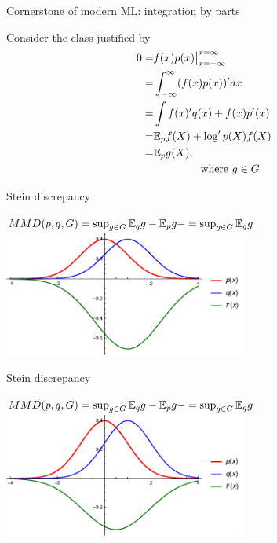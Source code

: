 \documentclass{beamer}
\begin{document}
  \begin{frame}{Cornerstone of modern ML: integration by parts}
  \begin{center}
  Consider the  class   justified by 
\begin{align*}
 0= &  f(x) p(x)  \big|_{x=-\infty}^{x=\infty} \\
   = &  \int_{-\infty}^{\infty} (f(x) p(x) )'  dx \\
   = &  \int   f(x)' q(x)   + f(x)p'(x)  \\
   = &  \mathbb{E}_p f(X)  +  \log' p(X) f(X) \\
   = & \mathbb{E}_p g(X), \\
    & \quad \quad \quad  \quad  \text{ where } g \in G
\end{align*}
\end{center}

 \end{frame} 
  

 \begin{frame}{Stein discrepancy }
 \begin{center}
 
$MMD(p,q,G) = \sup_{g\in G} \mathbb{E}_{q}g - \mathbb{E}_{p} g - = \sup_{g \in G} \mathbb{E}_{q} g $  \\
\vspace{0.5cm}
 \includegraphics[width=0.6\textwidth]{./img/s1.pdf} 
 \end{center}
 \end{frame} 
  
  
 \begin{frame}{Stein discrepancy}
 \begin{center}
 
$MMD(p,q,G) = \sup_{g\in G} \mathbb{E}_{q}g - \mathbb{E}_{p} g - = \sup_{g \in G} \mathbb{E}_{q} g $  \\
\vspace{0.5cm}
 \includegraphics[width=0.6\textwidth]{./img/s05.pdf} 
 \end{center}
 \end{frame} 
 
\end{document}
